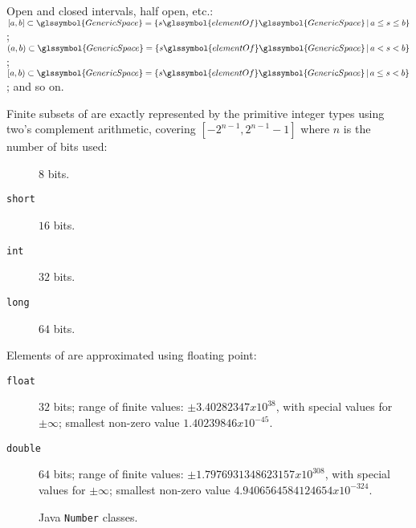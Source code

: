 Open and closed intervals, half open, etc.:
$[a,b] \subset \glssymbol{GenericSpace} = 
\SetSpec{s \glssymbol{elementOf} \glssymbol{GenericSpace}}
{a \leq s \leq b}$;
$(a,b) \subset \glssymbol{GenericSpace} = 
\SetSpec{s \glssymbol{elementOf} \glssymbol{GenericSpace}}
{a < s < b}$;
$[a,b) \subset \glssymbol{GenericSpace} = 
\SetSpec{s \glssymbol{elementOf} \glssymbol{GenericSpace}}
{a \leq s < b}$;
and so on.

\lstset{language=Java}


Finite subsets of  are exactly
represented by the primitive integer types using two's complement arithmetic, 
covering $[−2^{n−1}, 2^{n−1} − 1]$ where $n$ is the number of bits used:
\begin{description}
\item[] $8$ bits.
\item[\texttt{short}] $16$ bits.
\item[\texttt{int}] $32$ bits.
\item[\texttt{long}] $64$ bits.
\end{description}

Elements of  are approximated using floating
point:
\begin{description}
\item[\texttt{float}] $32$ bits; range of finite values:
$\pm 3.40282347 x 10^{38}$, with special values for $\pm\infty$;
smallest non-zero value $1.40239846 x 10^{-45}$.
\item[\texttt{double}] $64$ bits;
range of finite values: 
$\pm 1.7976931348623157 x 10^{308}$, with special values for $\pm\infty$;
smallest non-zero value $4.9406564584124654 x 10^{-324}$.
\end{description}


\begin{figure}[htbp]
\centering
\caption{Java \texttt{Number} classes.}
\label{fig:java-number-classes}
\end{figure}

